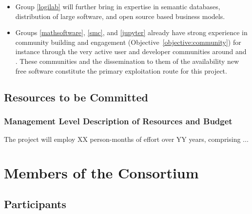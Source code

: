 \documentclass[noworkareas,deliverables,\classoptions]{euproposal}       %
\begin{document}
\begin{proposal}
\begin{itemize}
\item Group \ref{logilab} will further bring in expertise in semantic databases,
  distribution of large software, and open source based business models.

\item Groups \ref{mathsoftware}, \ref{smc}, and \ref{jupyter} already have strong
  experience in community building and engagement (Objective~\ref{objective:community})
  for instance through the very active user and developer communities around \GAP and
  \Sage. These communities and the dissemination to them of the availability new free
  software constitute the primary exploitation route for this project.
\end{itemize}



\draftpage

\subsection{Resources to be Committed}



\subsubsection*{Management Level Description of Resources and Budget}


The project will employ XX person-months of effort over YY years,
comprising ...



\newpage


\section{Members of the Consortium}

\subsection{Participants}


\end{proposal}
\end{document}
